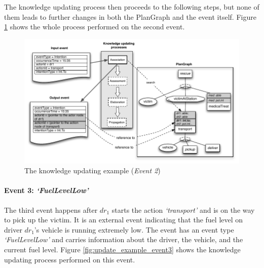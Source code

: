 The knowledge updating process then proceeds to the following steps, but none of them leads to further changes in both the PlanGraph and the event itself. Figure \ref{fig:update_example_event2} shows the whole process performed on the second event.
\begin{figure}[htbp] %
	\centering
	\includegraphics{update_example_event2.pdf} 
	\caption{The knowledge updating example (\emph{Event 2})}
	\label{fig:update_example_event2}
\end{figure}

\paragraph*{Event 3: \emph{`FuelLevelLow'}} %
\label{par:event_3_}
The third event happens after $dr_1$ starts the action \emph{`transport'} and is on the way to pick up the victim. It is an external event indicating that the fuel level on driver $dr_1$'s vehicle is running extremely low. The event has an event type \emph{`FuelLevelLow'} and carries information about the driver, the vehicle, and the current fuel level. Figure \ref{fig:update_example_event3} shows the knowledge updating process performed on this event.

